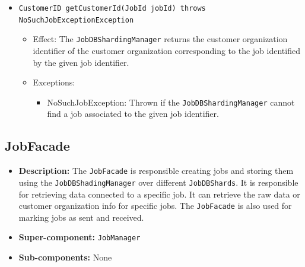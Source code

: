 \documentclass[a4paper,10pt]{article}
\begin{document}
\begin{itemize}
\begin{itemize}
   	   \item \texttt{CustomerID getCustomerId(JobId jobId) throws NoSuchJobExceptionException}
    	\begin{itemize}
    		\item Effect: The \texttt{JobDBShardingManager} returns the customer organization identifier of the customer organization corresponding to the job identified by the given job identifier.
    		\item Exceptions:
    		\begin{itemize}
    			\item NoSuchJobException: Thrown if the \texttt{JobDBShardingManager} cannot find a job associated to the given job identifier.
    		\end{itemize}
    	\end{itemize}	
    	
    \end{itemize}
\end{itemize}


\subsection{JobFacade}
\begin{itemize}
    \item \textbf{Description:} The \texttt{JobFacade} is responsible creating jobs and storing them using the \texttt{JobDBShadingManager} over different \texttt{JobDBShards}. It is responsible for retrieving data connected to a specific job. It can retrieve the raw data or customer organization info for specific jobs. The \texttt{JobFacade} is also used for marking jobs as sent and received.
    \item \textbf{Super-component:} \texttt{JobManager}
    \item \textbf{Sub-components:} None
\end{itemize}
\end{document}
